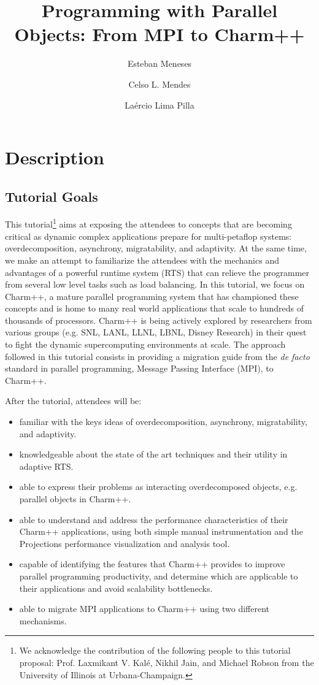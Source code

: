 \documentclass[letterpaper,10pt]{article}
\title{Programming with Parallel Objects: From MPI to Charm++}
\author{Esteban Meneses \and Celso L. Mendes \and La\'{e}rcio Lima Pilla}
\date{}
\begin{document}
\maketitle

\begin{abstract}

\end{abstract}

\section{Description}

\subsection{Tutorial Goals}

This tutorial\footnote{We acknowledge the contribution of the following people to this tutorial proposal: Prof. Laxmikant V. Kal\'{e},  Nikhil Jain, and Michael Robson from the University of Illinois at Urbana-Champaign.} aims at exposing the attendees to concepts that are
becoming critical as dynamic complex applications prepare for
multi-petaflop systems: overdecomposition, asynchrony, migratability,
and adaptivity. At the same time, we make an attempt to familiarize the attendees
with the mechanics and advantages of a powerful runtime system (RTS) that can relieve the
programmer from several low level tasks such as load balancing. In this tutorial,
we focus on Charm++, a mature parallel programming system that has championed
these concepts and is home to many real world applications that scale to hundreds of
thousands of processors. Charm++ is being actively explored by researchers
from various groups (e.g. SNL, LANL, LLNL, LBNL, Disney Research) in their quest to
fight the dynamic supercomputing environments at scale. The approach followed in this tutorial consists in providing a migration guide from the {\em de facto} standard in parallel programming, Message Passing Interface (MPI), to Charm++.

After the tutorial, attendees will be:
\begin{itemize}
\item familiar with the keys ideas of overdecomposition, asynchrony, migratability, and adaptivity.
\item knowledgeable about the state of the art techniques and their utility in adaptive RTS.
\item able to express their problems as interacting overdecomposed objects, e.g.
parallel objects in Charm++.
\item able to understand and address the performance characteristics of their Charm++
applications, using both simple manual instrumentation and the Projections
performance visualization and analysis tool.
\item capable of identifying the features that Charm++ provides to improve parallel programming
productivity, and determine which are applicable to their applications and avoid scalability bottlenecks.
\item able to migrate MPI applications to Charm++ using two different mechanisms.
\end{itemize}
\end{document}
